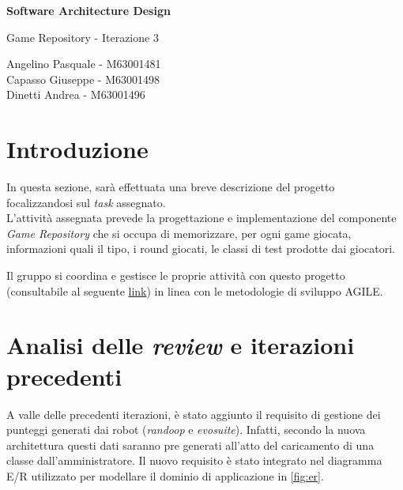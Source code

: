 \documentclass{article}
\begin{document}
\begin{titlepage}
    \begin{center}
        \vspace*{1cm}
            
        \Huge
        \textbf{Software Architecture Design}
            
        \vspace{0.5cm}
        \LARGE
        Game Repository - Iterazione 3
        
        \vfill
        \vspace{0.8cm}
        
        \Large
        Angelino Pasquale - M63001481 \\
        Capasso Giuseppe -  M63001498 \\
        Dinetti Andrea -  M63001496

    \end{center}
\end{titlepage}

\thispagestyle{empty}

\printglossaries

\newpage
\thispagestyle{empty}
\tableofcontents

\newpage
\thispagestyle{empty}
\section*{Introduzione}
In questa sezione, sarà effettuata una breve descrizione del progetto focalizzandosi sul \textit{task} assegnato.\\ 

L'attività assegnata prevede la progettazione e implementazione del componente \textit{Game Repository} che si occupa di memorizzare, per ogni \gls{game} giocata, informazioni quali il tipo, i \gls{round} giocati, le classi di test prodotte dai giocatori.

Il gruppo si coordina e gestisce le proprie attività con questo progetto
(consultabile al seguente \href{https://github.com/users/alarmfox/projects/2}{link}) in linea con le metodologie di sviluppo AGILE.

\newpage
\section{Analisi delle \textit{review} e iterazioni precedenti}
A valle delle precedenti iterazioni, è stato aggiunto il requisito di gestione dei punteggi generati dai robot (\textit{randoop} e \textit{evosuite}). Infatti, secondo la nuova architettura questi dati saranno pre generati all'atto del caricamento di una classe dall'amministratore.
Il nuovo requisito è stato integrato nel diagramma E/R utilizzato per modellare il dominio di applicazione in \cref{fig:er}.
\end{document}
